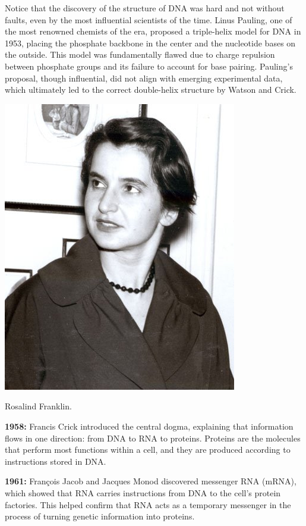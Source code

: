 Notice that the discovery of the structure of DNA was hard and not without faults, even by the most influential scientists of the time. Linus Pauling, one of the most renowned chemists of the era, proposed a triple-helix model for DNA in 1953, placing the phosphate backbone in the center and the nucleotide bases on the outside. This model was fundamentally flawed due to charge repulsion between phosphate groups and its failure to account for base pairing. Pauling’s proposal, though influential, did not align with emerging experimental data, which ultimately led to the correct double-helix structure by Watson and Crick.

\begin{marginfigure}
    \includegraphics{figs/history/rosalind-franklin.jpeg}
    \caption[6pt]{Rosalind Franklin.}
    \label{fig:franklin}
\end{marginfigure}

\medskip\noindent\textbf{1958:} Francis Crick introduced the central dogma, explaining that information flows in one direction: from DNA to RNA to proteins. Proteins are the molecules that perform most functions within a cell, and they are produced according to instructions stored in DNA.

\medskip\noindent\textbf{1961:} François Jacob and Jacques Monod discovered messenger RNA (mRNA), which showed that RNA carries instructions from DNA to the cell's protein factories. This helped confirm that RNA acts as a temporary messenger in the process of turning genetic information into proteins.

